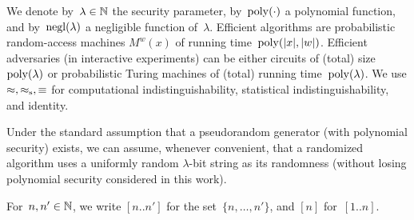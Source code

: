 We denote by~${\lambda\in{\mathbb{N}}}$ the security parameter,
by~$\operatorname{poly}({\cdot})$ a polynomial function, and
by~$\operatorname{negl}(\lambda)$ a negligible function of~$\lambda$.
Efficient algorithms are probabilistic random-access machines $M^w(x)$ of running time~$\operatorname{poly}(|x|,|w|)$.
Efficient adversaries (in interactive experiments) can be either circuits of (total) size~$\operatorname{poly}(\lambda)$ or probabilistic Turing machines of (total) running time~$\operatorname{poly}(\lambda)$.
We use $\approx,\approx_{\textup{s}},\equiv$ for computational indistinguishability, statistical indistinguishability, and identity.

Under the standard assumption that a pseudorandom generator (with polynomial security) exists,
we can assume, whenever convenient, that a randomized algorithm uses a uniformly random $\lambda$-bit string as its randomness (without losing polynomial security considered in this work).

For~${n,n'\in{\mathbb{N}}}$, we write $[n..n']$ for the set~$\{n,\dots,n'\}$,
and $[n]$ for~$[1..n]$.
